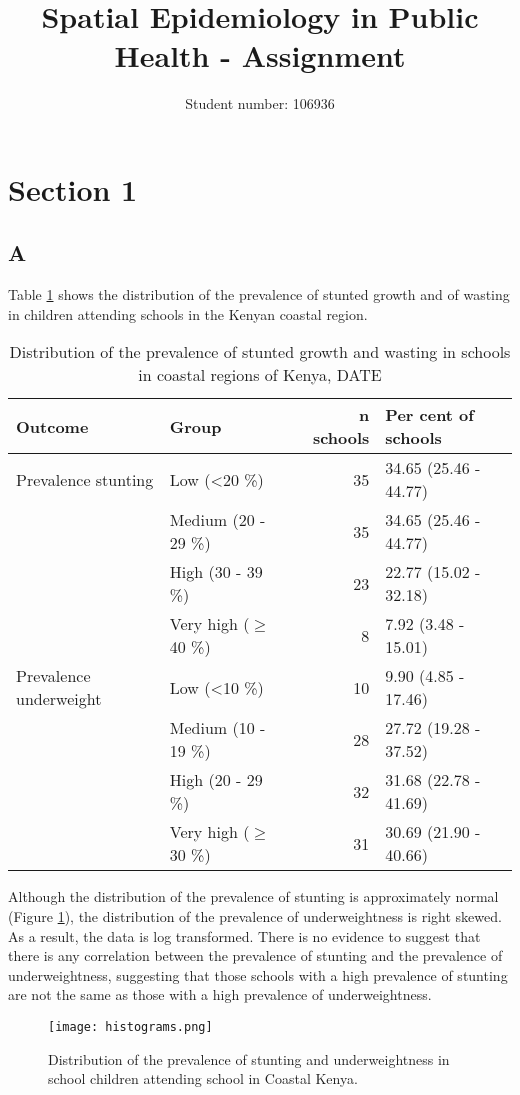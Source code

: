 \documentclass[11pt,a4paper,twoside]{article}\usepackage[]{graphicx}\usepackage[]{color}
\title{Spatial Epidemiology in Public Health - Assignment}
\author{Student number: 106936}
\begin{document}
\section*{Section 1}
\subsection*{A}
Table \ref{tab1} shows the distribution of the prevalence of stunted growth and of wasting in children attending schools in the Kenyan coastal region.
\begin{table}[ht]
\centering
\begin{tabular}{llrl}
  \toprule
Outcome & Group & n schools & Per cent of schools \\ 
  \midrule
Prevalence stunting & Low (\textless 20 \%) & 35 & 34.65 (25.46 - 44.77) \\ 
   & Medium (20 - 29 \%) & 35 & 34.65 (25.46 - 44.77) \\ 
   & High (30 - 39 \%) & 23 & 22.77 (15.02 - 32.18) \\ 
   & Very high ($\ge$ 40 \%) & 8 & 7.92 (3.48 - 15.01) \\ 
  Prevalence underweight & Low (\textless 10 \%) & 10 & 9.90 (4.85 - 17.46) \\ 
   & Medium (10 - 19 \%) & 28 & 27.72 (19.28 - 37.52) \\ 
   & High (20 - 29 \%) & 32 & 31.68 (22.78 - 41.69) \\ 
   & Very high ($\ge$ 30 \%) & 31 & 30.69 (21.90 - 40.66) \\ 
   \bottomrule
\end{tabular}
\caption{Distribution of the prevalence of stunted growth and wasting in schools in coastal regions of Kenya, DATE} 
\label{tab1}
\end{table}


Although the distribution of the prevalence of stunting is approximately normal (Figure \ref{dist}), the distribution of the prevalence of underweightness is right skewed. 
As a result, the data is log transformed. 
There is no evidence to suggest that there is any correlation between the prevalence of stunting and the prevalence of underweightness, suggesting that those schools with a high prevalence of stunting are not the same as those with a high prevalence of underweightness. 
\begin{figure}[b]
\texttt{[image: histograms.png]}
\caption{Distribution of the prevalence of stunting and underweightness in school children attending school in Coastal Kenya.}
\label{dist}
\end{figure}
\end{document}
